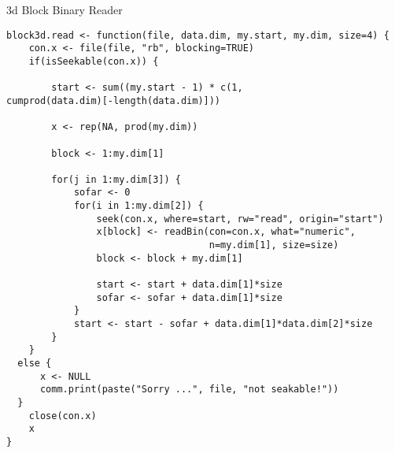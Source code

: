 \begin{frame}{3d Block Binary Reader}
    \begin{lstlisting}
block3d.read <- function(file, data.dim, my.start, my.dim, size=4) {
    con.x <- file(file, "rb", blocking=TRUE)
    if(isSeekable(con.x)) {

        start <- sum((my.start - 1) * c(1, 
cumprod(data.dim)[-length(data.dim)]))

        x <- rep(NA, prod(my.dim))
        
        block <- 1:my.dim[1]
        
        for(j in 1:my.dim[3]) {
            sofar <- 0
            for(i in 1:my.dim[2]) {
                seek(con.x, where=start, rw="read", origin="start")
                x[block] <- readBin(con=con.x, what="numeric",
                                    n=my.dim[1], size=size)
                block <- block + my.dim[1]

                start <- start + data.dim[1]*size
                sofar <- sofar + data.dim[1]*size
            }
            start <- start - sofar + data.dim[1]*data.dim[2]*size
        }
    }
  else {
      x <- NULL
      comm.print(paste("Sorry ...", file, "not seakable!"))
  }
    close(con.x)
    x
}
    \end{lstlisting}
\end{frame}
